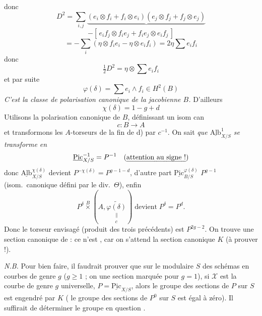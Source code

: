 \documentclass[11pt,a4paper]{article}
\begin{document}
donc
\[
D^{2} = \sum_{i,j} \underbrace{(e_i \otimes f_i + f_i \otimes e_i)(e_j \otimes f_j + f_j \otimes e_j)}
\]
\[
- [\, e_i f_j \otimes f_i e_j + f_i e_j \otimes e_i f_j \,]
\]
\[
= -\sum_i (\eta \otimes f_i e_i - \eta \otimes e_i f_i) = 2\eta \sum e_i f_i
\]
donc
\[
\tfrac{1}{2} D^{2} = \eta \otimes \sum e_i f_i
\]
et par suite
\[
\varphi(\delta) = \sum e_i \wedge f_i \in H^{2}(B)
\]
\emph{C'est la classe de polarisation canonique de la jacobienne $B$.}
D'ailleurs
\[
\chi(\delta) = 1 - g + d
\]
\struck{\ill{}} Utilisons la polarisation canonique  de $B$, définissant un isom can
\[
c : B \longrightarrow A
\]
et transformons les $A$-torseurs de la fin de d) par $c^{-1}$. On sait
\emph{que $\underline{\mathrm{Alb}}^{1}_{X/S}$ se transforme en}
\[
\underline{\mathrm{Pic}}^{-1}_{X/S} = P^{-1}
\quad \text{(\emph{attention au signe !})}
\]
donc $\underline{\mathrm{Alb}}^{\chi(\delta)}_{X/S}$ devient
$P^{-\chi(\delta)} = P^{g-1-d}$, d'autre part
$\underline{\mathrm{Pic}}^{\varphi(\delta)}_{B/S}$
 
 $P^{g-1}$ (isom.\ canonique défini par
le div.\ $\Theta$), enfin
\[
P^{\delta} \overset{B}{\times} (A, \underset{\substack{\parallel \\ c}}{\widetilde{\varphi(\delta)}})
\;\text{devient}\; P^{\delta} = P^{d} .
\]
Donc le torseur envisagé (produit des trois précédents) est $P^{2g-2}$. On
trouve \ill{} une section canonique de \ill{} : ce n'est , car on s'attend  la section canonique $K$
(à prouver !).


\emph{N.B.} Pour bien faire, il faudrait prouver que sur le 
modulaire $S$ des schémas en courbes \add{\ill{}} de genre $g$
 ($g \geq 1$ ; on \struck{\ill{}}  une
section marquée pour $g = 1$),  si $\mathcal{X}$ est la
courbe de genre $g$ \struck{\ill{}} universelle, $P = \underline{\mathrm{Pic}}_{X/S}$,
alors le groupe des sections de $P$ sur $S$ est engendré par $K$
(\struck{\ill{}}  le groupe des sections de $P^{0}$
sur $S$ est égal à zéro). Il suffirait de déterminer le groupe en question
.
\end{document}
